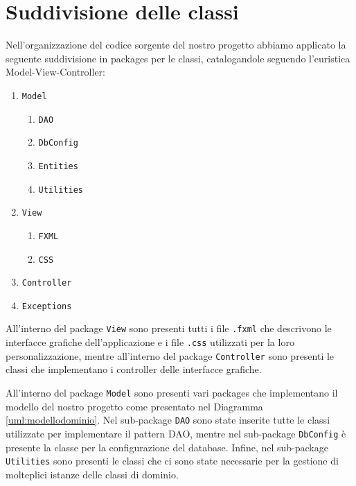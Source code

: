 \section{Suddivisione delle classi}
Nell'organizzazione del codice sorgente del nostro progetto abbiamo applicato la seguente suddivisione in packages per le classi, catalogandole seguendo l'euristica Model-View-Controller:
\begin{enumerate}
\item \texttt{Model}
\begin{enumerate}
\item \texttt{DAO}
\item \texttt{DbConfig}
\item \texttt{Entities}
\item \texttt{Utilities}
\end{enumerate}
\item \texttt{View}
\begin{enumerate}
\item \texttt{FXML}
\item \texttt{CSS}
\end{enumerate}
\item \texttt{Controller}
\item \texttt{Exceptions}
\end{enumerate}

All'interno del package \texttt{View} sono presenti tutti i file \texttt{.fxml} che descrivono le interfacce grafiche dell'applicazione e i file \texttt{.css} utilizzati per la loro personalizzazione, mentre all'interno del package \texttt{Controller} sono presenti le classi che implementano i controller delle interfacce grafiche.
\bigskip

All'interno del package \texttt{Model} sono presenti vari packages che implementano il modello del nostro progetto come presentato nel Diagramma \ref{uml:modellodominio}. Nel sub-package \texttt{DAO} sono state inserite tutte le classi utilizzate per implementare il pattern DAO, mentre nel sub-package \texttt{DbConfig} è presente la classe per la configurazione del database. Infine,  nel sub-package \texttt{Utilities} sono presenti le classi che ci sono state necessarie per la gestione di molteplici istanze delle classi di dominio.